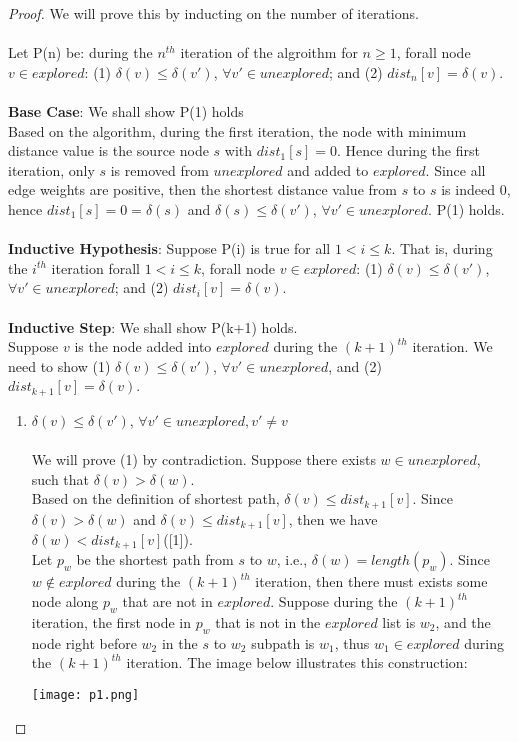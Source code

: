 \documentclass[11pt, a4paper]{article} %
\theoremstyle{definition}
\newcommand\tab[1][1cm]{\hspace*{#1}}
\begin{document}
\begin{proof}
We will prove this by inducting on the number of iterations. 
\\\\
Let P(n) be: during the $n^{th}$ iteration of the algroithm for $n \geq 1$, forall node $v \in explored$: (1) $\delta(v) \leq \delta(v')$, $\forall v' \in unexplored$; and (2) $dist_n[v] = \delta(v)$. 
\tab\\\\
\textbf{Base Case}: We shall show P(1) holds \\
Based on the algorithm, during the first iteration, the node with minimum distance value is the source node $s$ with $dist_1[s] = 0$. Hence during the first iteration, only $s$ is removed from $unexplored$ and added to $explored$. Since all edge weights are positive, then the shortest distance value from $s$ to $s$ is indeed $0$, hence $dist_1[s] = 0 = \delta(s)$ and $\delta(s) \leq \delta(v')$, $\forall v' \in unexplored$. P(1) holds.
\\\\
\textbf{Inductive Hypothesis}: Suppose P(i) is true for all $1 < i \leq k$. That is, during the $i^{th}$ iteration forall $1 < i \leq k$, forall node $v \in explored$: (1) $\delta(v) \leq \delta(v')$, $\forall v' \in unexplored$; and (2) $dist_i[v] = \delta(v)$. 
\\\\
\textbf{Inductive Step}: We shall show P(k+1) holds.
\\
Suppose $v$ is the node added into $explored$ during the $(k+1)^{th}$ iteration. We need to show (1) $\delta(v) \leq \delta(v')$, $\forall v' \in unexplored$, and (2) $dist_{k+1}[v] = \delta(v)$. 
\begin{enumerate}
\item $\delta(v) \leq \delta(v')$, $\forall v' \in unexplored, v' \neq v$
\\\\
We will prove (1) by contradiction. Suppose there exists $w \in unexplored$, such that $\delta(v) > \delta(w)$. 
\\
Based on the definition of shortest path, $\delta(v) \leq dist_{k+1}[v]$. Since $\delta(v) > \delta(w)$ and $\delta(v) \leq dist_{k+1}[v]$, then we have $\delta(w) < dist_{k+1}[v]$([1]). 
\\
Let $p_w$ be the shortest path from $s$ to $w$, i.e., $\delta(w) = length(p_w)$. Since $w \notin explored$ during the $(k+1)^{th}$ iteration, then there must exists some node along $p_w$ that are not in $explored$. Suppose during the $(k+1)^{th}$ iteration, the first node in $p_w$ that is not in the $explored$ list is $w_2$, and the node right before $w_2$ in the $s$ to $w_2$ subpath is $w_1$, thus $w_1 \in explored$ during the $(k+1)^{th}$ iteration. The image below illustrates this construction: 
\\
\begin{center}
\texttt{[image: p1.png]}
\end{center}


\end{enumerate}
\end{proof}
\end{document}
